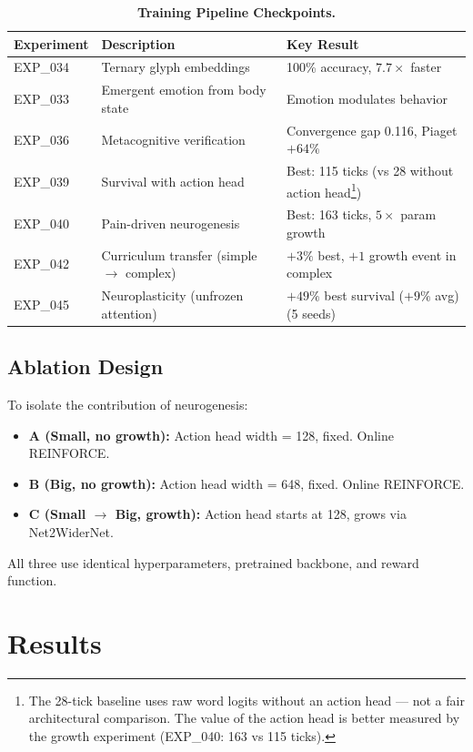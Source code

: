 \documentclass{article}
\begin{document}
\begin{table}[h]
\centering
\caption{\textbf{Training Pipeline Checkpoints.}}
\label{tab:pipeline}
\begin{tabularx}{\textwidth}{p{2.2cm} p{5.5cm} X}
\toprule
\textbf{Experiment} & \textbf{Description} & \textbf{Key Result} \\
\midrule
EXP\_034 & Ternary glyph embeddings & 100\% accuracy, $7.7\times$ faster \\
EXP\_033 & Emergent emotion from body state & Emotion modulates behavior \\
EXP\_036 & Metacognitive verification & Convergence gap 0.116, Piaget $+64\%$ \\
EXP\_039 & Survival with action head & Best: 115 ticks (vs 28 without action head\footnote{The 28-tick baseline uses raw word logits without an action head --- not a fair architectural comparison. The value of the action head is better measured by the growth experiment (EXP\_040: 163 vs 115 ticks).}) \\
EXP\_040 & Pain-driven neurogenesis & Best: 163 ticks, $5\times$ param growth \\
EXP\_042 & Curriculum transfer (simple $\rightarrow$ complex) & $+3\%$ best, $+1$ growth event in complex \\
EXP\_045 & Neuroplasticity (unfrozen attention) & $+49\%$ best survival ($+9\%$ avg) (5 seeds) \\
\bottomrule
\end{tabularx}
\end{table}

\subsection{Ablation Design}
To isolate the contribution of neurogenesis:
\begin{itemize}
    \item \textbf{A (Small, no growth):} Action head width = 128, fixed. Online REINFORCE.
    \item \textbf{B (Big, no growth):} Action head width = 648, fixed. Online REINFORCE.
    \item \textbf{C (Small $\rightarrow$ Big, growth):} Action head starts at 128, grows via Net2WiderNet.
\end{itemize}
All three use identical hyperparameters, pretrained backbone, and reward function.

\section{Results}
\end{document}
